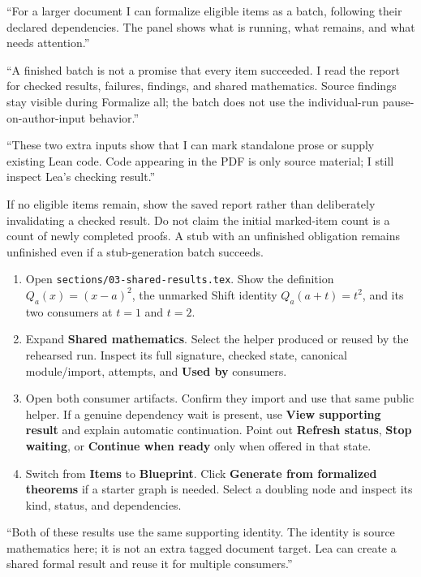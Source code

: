 \say
``For a larger document I can formalize eligible items as a batch, following
their declared dependencies. The panel shows what is running, what remains,
and what needs attention.''

``A finished batch is not a promise that every item succeeded. I read the
report for checked results, failures, findings, and shared mathematics.
Source findings stay visible during Formalize all; the batch does not use
the individual-run pause-on-author-input behavior.''

``These two extra inputs show that I can mark standalone prose or supply
existing Lean code. Code appearing in the PDF is only source material;
I still inspect Lea's checking result.''

\fallback
If no eligible items remain, show the saved report rather than deliberately
invalidating a checked result. Do not claim the initial marked-item count is a
count of newly completed proofs. A stub with an unfinished obligation remains
unfinished even if a stub-generation batch succeeds.

\clearpage
{}

\click
\begin{enumerate}
  \item Open \texttt{sections/03-shared-results.tex}. Show the definition
    $Q_a(x)=(x-a)^2$, the unmarked Shift identity $Q_a(a+t)=t^2$, and its two
    consumers at $t=1$ and $t=2$.
  \item Expand \textbf{Shared mathematics}. Select the helper produced or reused
    by the rehearsed run. Inspect its full signature, checked state, canonical
    module/import, attempts, and \textbf{Used by} consumers.
  \item Open both consumer artifacts. Confirm they import and use that same
    public helper. If a genuine dependency wait is present, use
    \textbf{View supporting result} and explain automatic continuation. Point
    out \textbf{Refresh status}, \textbf{Stop waiting}, or \textbf{Continue when ready}
    only when offered in that state.
  \item Switch from \textbf{Items} to \textbf{Blueprint}. Click
    \textbf{Generate from formalized theorems} if a starter graph is needed.
    Select a doubling node and inspect its kind, status, and dependencies.
\end{enumerate}

\say
``Both of these results use the same supporting identity. The identity is
source mathematics here; it is not an extra tagged document target. Lea can
create a shared formal result and reuse it for multiple consumers.''

